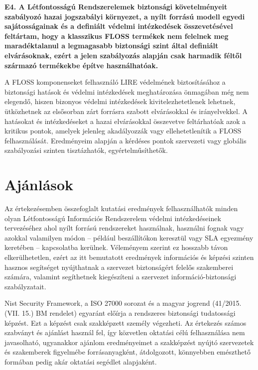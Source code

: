 \documentclass[12pt,magyar,a4paper,oneside]{scrreprt}
\begin{document}
\textbf{E4. A Létfontosságú Rendszerelemek biztonsági követelményeit
szabályozó hazai jogszabályi környezet, a nyílt forrású modell egyedi
sajátosságainak és a definiált védelmi intézkedések összevetésével
feltártam, hogy a klasszikus FLOSS termékek nem felelnek meg
maradéktalanul a legmagasabb biztonsági szint által definiált
elvárásoknak, ezért a jelen szabályozás alapján csak harmadik féltől
származó termékekbe építve használhatóak.}

A FLOSS komponenseket felhasználó LIRE védelmének biztosításához a
biztonsági hatások és védelmi intézkedések meghatározása önmagában még
nem elegendő, hiszen bizonyos védelmi intézkedések kivitelezhetetlenek
lehetnek, ütközhetnek az elsősorban zárt forrásra szabott elvárásokkal
és irányelvekkel. A hatásokat és intézkedéseket a hazai elvárásokkal
összevetve feltárhatóak azok a kritikus pontok, amelyek jelenleg
akadályozzák vagy ellehetetlenítik a FLOSS felhasználását. Eredményeim
alapján a kérdéses pontok szervezeti vagy globális szabályozási szinten
tisztázhatók, egyértelműsíthetők.

\hypertarget{ajuxe1nluxe1sok}{%
\chapter{Ajánlások}\label{ajuxe1nluxe1sok}}

Az értekezésemben összefoglalt kutatási eredmények felhasználhatók
minden olyan Létfontosságú Információs Rendszerelem védelmi
intézkedéseinek tervezéséhez ahol nyílt forrású rendszereket használnak,
használni fognak vagy azokkal valamilyen módon -- például beszállítókon
keresztül vagy SLA egyezmény keretében -- kapcsolatba kerülnek.
Véleményem szerint ez hosszabb távon elkerülhetetlen, ezért az itt
bemutatott eredmények információs és képzési szinten hasznos segítséget
nyújthatnak a szervezet biztonságért felelős szakemberei számára,
valamint segíthetnek kiegészíteni a szervezet információ-biztonsági
szabályzatait.

Nist Security Framework, a ISO 27000 sorozat és a magyar jogrend
(41/2015. (VII. 15.) BM rendelet) egyaránt előírja a rendszeres
biztonsági tudatossági képzést. Ezt a képzést csak szakképzett személy
végezheti. Az értekezés számos szabványt és ajánlást használ fel, így
közvetlen oktatási célú felhasználása nem javasolható, ugyanakkor
ajánlom eredményeimet a szakképzést nyújtó szervezetek és szakemberek
figyelmébe forrásanyagként, átdolgozott, könnyebben emészthető formában
pedig akár oktatási segédlet alapjaként.
\end{document}
